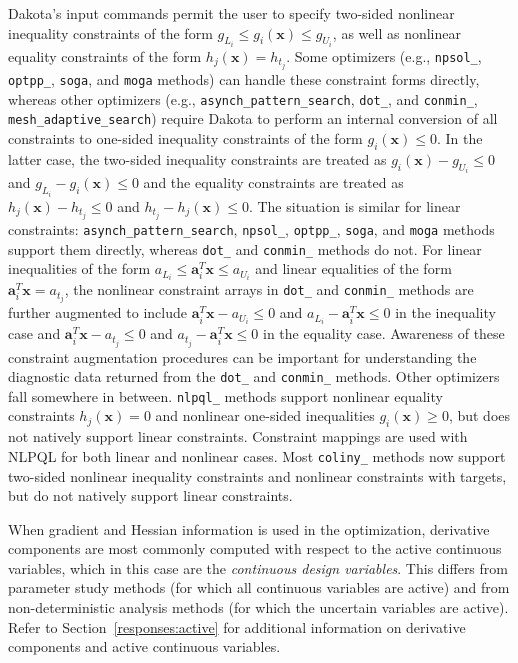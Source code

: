 Dakota's input commands permit the user to specify two-sided nonlinear
inequality constraints of the form $g_{L_{i}} \leq g_{i}(\mathbf{x})
\leq g_{U_{i}}$, as well as nonlinear equality constraints of the form
$h_{j}(\mathbf{x}) = h_{t_{j}}$. Some optimizers (e.g.,
\texttt{npsol\_}, \texttt{optpp\_}, \texttt{soga}, and \texttt{moga}
methods) can handle these constraint forms directly, whereas other
optimizers (e.g., \texttt{asynch\_pattern\_search}, \texttt{dot\_},
and \texttt{conmin\_}, \texttt{mesh\_adaptive\_search}) require Dakota
to perform an internal conversion of all constraints to one-sided
inequality constraints of the form $g_{i}(\mathbf{x}) \leq 0$. In the
latter case, the two-sided inequality constraints are treated as
$g_{i}(\mathbf{x}) - g_{U_{i}} \leq 0$ and $g_{L_{i}} -
g_{i}(\mathbf{x}) \leq 0$ and the equality constraints are treated as
$h_{j}(\mathbf{x}) - h_{t_{j}} \leq 0$ and $h_{t_{j}} -
h_{j}(\mathbf{x}) \leq 0$. The situation is similar for linear
constraints: \texttt{asynch\_pattern\_search}, \texttt{npsol\_},
\texttt{optpp\_}, \texttt{soga}, and \texttt{moga} methods support
them directly, whereas \texttt{dot\_} and \texttt{conmin\_} methods do
not. For linear inequalities of the form $a_{L_{i}} \leq
\mathbf{a}_{i}^{T}\mathbf{x} \leq a_{U_{i}}$ and linear equalities of
the form $\mathbf{a}_{i}^{T}\mathbf{x} = a_{t_{j}}$, the nonlinear
constraint arrays in \texttt{dot\_} and \texttt{conmin\_} methods are
further augmented to include $\mathbf{a}_{i}^{T}\mathbf{x} - a_{U_{i}}
\leq 0$ and $a_{L_{i}} - \mathbf{a}_{i}^{T}\mathbf{x} \leq 0$ in the
inequality case and $\mathbf{a}_{i}^{T}\mathbf{x} - a_{t_{j}} \leq 0$
and $a_{t_{j}} - \mathbf{a}_{i}^{T}\mathbf{x} \leq 0$ in the equality
case. Awareness of these constraint augmentation procedures can be
important for understanding the diagnostic data returned from the
\texttt{dot\_} and \texttt{conmin\_} methods. Other optimizers fall
somewhere in between.  \texttt{nlpql\_} methods support nonlinear
equality constraints $h_{j}(\mathbf{x}) = 0$ and nonlinear one-sided
inequalities $g_{i}(\mathbf{x}) \geq 0$, but does not natively support
linear constraints. Constraint mappings are used with NLPQL for both
linear and nonlinear cases. Most \texttt{coliny\_} methods now support
two-sided nonlinear inequality constraints and nonlinear constraints
with targets, but do not natively support linear constraints.

When gradient and Hessian information is used in the optimization,
derivative components are most commonly computed with respect to the
active continuous variables, which in this case are the
\emph{continuous design variables}. This differs from parameter study
methods (for which all continuous variables are active) and from
non-deterministic analysis methods (for which the uncertain variables
are active). Refer to Section~\ref{responses:active} for additional
information on derivative components and active continuous variables.

